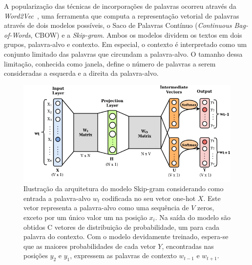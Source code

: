 \documentclass{SBCbookchapter}
\begin{document}
A popularização das técnicas de incorporações de palavras ocorreu através da \textit{Word2Vec}~\cite{mikolov2013efficient}, uma ferramenta que computa a representação vetorial de palavras através de dois modelos possíveis, o Saco de Palavras Contínuo (\textit{Continuous Bag-of-Words}, CBOW) e a \textit{Skip-gram}. Ambos os modelos dividem os textos em dois grupos, palavra-alvo e contexto. Em especial, o contexto é interpretado como um conjunto limitado das palavras que circundam a palavra-alvo. O tamanho dessa limitação, conhecida como janela, define o número de palavras a serem consideradas a esquerda e a direita da palavra-alvo. 

\begin{figure}[h]
	\centering
	\includegraphics[width=1\columnwidth]{skipgram.png}
	\caption{Ilustração da arquitetura do modelo Skip-gram considerando como entrada a palavra-alvo $w_t$ codificada no seu vetor one-hot $X$. Este vetor representa a palavra-alvo como uma sequência de $V$ zeros, exceto por um único valor um na posição $x_i$. Na saída do modelo são obtidos C vetores de distribuição de probabilidade, um para cada palavra do contexto. Com o modelo devidamente treinado, espera-se que as maiores probabilidades de cada vetor $Y$, encontradas nas posições $y_2$ e $y_1$, expressem as palavras de contexto $w_{t-1}$ e $w_{t+1}$.}
	\label{fig:skip-gram}
\end{figure}
\end{document}
